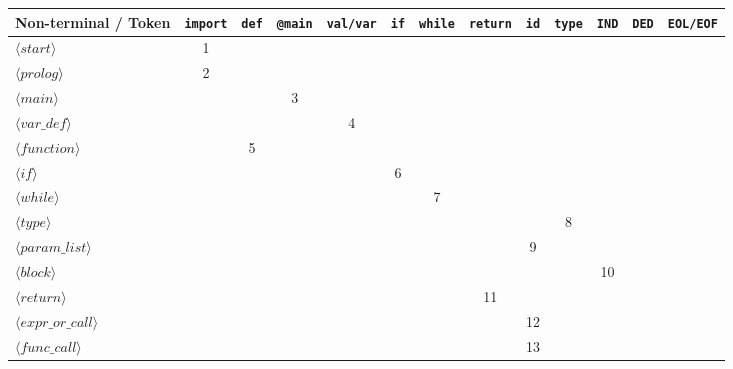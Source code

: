 \documentclass[12pt,a4paper]{article}
\begin{document}
\begin{table}[h!]
\centering
\scriptsize
\begin{tabular}{|l|c|c|c|c|c|c|c|c|c|c|c|c|}
\hline
Non-terminal / Token & \texttt{import} & \texttt{def} & \texttt{@main} & \texttt{val/var} & \texttt{if} & \texttt{while} & \texttt{return} & \texttt{id} & \texttt{type} & \texttt{IND} & \texttt{DED} & \texttt{EOL/EOF} \\ \hline
$\langle start \rangle$          & 1 &   &   &   &   &   &    &    &   &    &   &   \\ \hline
$\langle prolog \rangle$         & 2 &   &   &   &   &   &    &    &   &    &   &   \\ \hline
$\langle main \rangle$           &   &   & 3 &   &   &   &    &    &   &    &   &   \\ \hline
$\langle var\_def \rangle$       &   &   &   & 4 &   &   &    &    &   &    &   &   \\ \hline
$\langle function \rangle$       &   & 5 &   &   &   &   &    &    &   &    &   &   \\ \hline
$\langle if \rangle$             &   &   &   &   & 6 &   &    &    &   &    &   &   \\ \hline
$\langle while \rangle$          &   &   &   &   &   & 7 &    &    &   &    &   &   \\ \hline
$\langle type \rangle$           &   &   &   &   &   &   &    &    & 8 &    &   &   \\ \hline
$\langle param\_list \rangle$    &   &   &   &   &   &   &    & 9  &   &    &   &   \\ \hline
$\langle block \rangle$          &   &   &   &   &   &   &    &    &   & 10 &   &   \\ \hline
$\langle return \rangle$         &   &   &   &   &   &   & 11 &    &   &    &   &   \\ \hline
$\langle expr\_or\_call \rangle$ &   &   &   &   &   &   &    & 12 &   &    &   &   \\ \hline
$\langle func\_call \rangle$     &   &   &   &   &   &   &    & 13 &   &    &   &   \\ \hline

\end{tabular}
\end{table}
\end{document}
